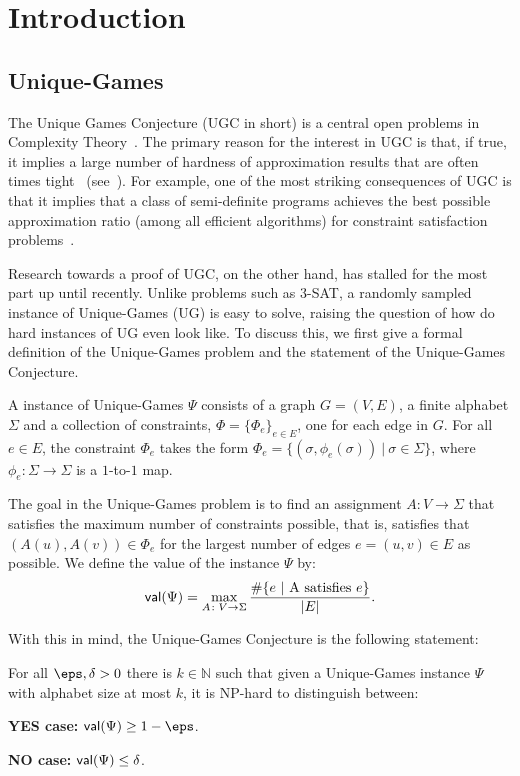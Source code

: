 \section{Introduction}
\subsection{Unique-Games}\label{sec:ug}
The Unique Games Conjecture (UGC in short) 
is a central open problems in Complexity Theory~\cite{Khot02}.
The primary reason for the interest in UGC is that, if true, it
implies a large number of hardness of approximation results 
that are often times tight~\cite{KhotR08,KhotKMO07,Austrin,KNSgroth,Raghavendra08}
(see~\cite{KhotICM,trevisan2012khot}). For example, 
one of the most striking
consequences of UGC is that it 
implies that a class of semi-definite programs
achieves the best possible approximation ratio (among all 
efficient algorithms) for constraint satisfaction problems~\cite{Raghavendra08}.

Research towards a proof of UGC, on the other hand, 
has stalled for the most part up until recently. Unlike problems such 
as $3$-SAT, a randomly sampled instance of Unique-Games (UG) is easy to solve, raising the question of how do hard instances of UG
even look like. To discuss this, we first give 
a formal definition of the Unique-Games problem and the statement of the Unique-Games Conjecture.
\begin{definition}
A instance of Unique-Games $\Psi$ consists of a graph $G = (V,E)$, 
a finite alphabet $\Sigma$ and a collection of constraints, 
$\Phi = \{\Phi_e\}_{e\in E}$, one for each edge in $G$. 
For all $e\in E$, the constraint $\Phi_e$ takes the form 
$\Phi_e = \{(\sigma, \phi_e(\sigma))~|~\sigma\in \Sigma\}$, 
where $\phi_e\colon \Sigma\to\Sigma$ is a $1$-to-$1$ map.

The goal in the Unique-Games problem is to find an assignment 
$A\colon V\to\Sigma$ that satisfies the maximum number of constraints possible, that is, satisfies that $(A(u),A(v))\in \Phi_{e}$ 
for the largest number of edges $e=(u,v)\in E$ as possible. We define
 the value of the instance $\Psi$ by:
\[
{\sf val}(\Psi) = \max_{A\colon V\to\Sigma}\frac{\#\{e~|~\text{A satisfies $e$}\}}{|E|}.
\]
\end{definition}
With this in mind, the Unique-Games Conjecture is the following statement:
\begin{conjecture}
For all $\eps,\delta>0$ there is $k\in\mathbb{N}$ such that 
given a Unique-Games instance $\Psi$ with alphabet size at most $k$,
it is NP-hard to distinguish between:

\textbf{YES case:} ${\sf val}(\Psi)\geq 1-\eps$.

\textbf{NO case:} ${\sf val}(\Psi)\leq \delta$.
\end{conjecture}

